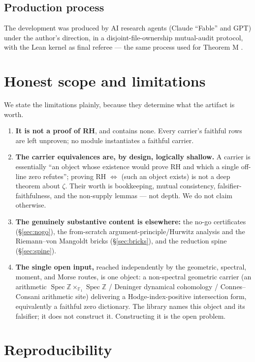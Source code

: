 \documentclass[11pt]{amsart}
\theoremstyle{definition}
\theoremstyle{remark}
\newcommand{\Z}{\mathbb{Z}}
\DeclareMathOperator{\Spec}{Spec}
\begin{document}
\subsection*{Production process}
The development was produced by AI research agents (Claude ``Fable'' and GPT)
under the author's direction, in a disjoint-file-ownership mutual-audit
protocol, with the Lean kernel as final referee --- the same process used for
Theorem M \cite{theoremM}.

\section{Honest scope and limitations}\label{sec:honest}

We state the limitations plainly, because they determine what the artifact is
worth.
\begin{enumerate}
\item \textbf{It is not a proof of RH}, and contains none. Every carrier's
faithful rows are left unproven; no module instantiates a faithful carrier.
\item \textbf{The carrier equivalences are, by design, logically shallow.} A
carrier is essentially ``an object whose existence would prove RH and which a
single off-line zero refutes''; proving RH $\iff$ (such an object exists) is not
a deep theorem about $\zeta$. Their worth is bookkeeping, mutual consistency,
falsifier-faithfulness, and the non-supply lemmas --- not depth. We do not claim
otherwise.
\item \textbf{The genuinely substantive content is elsewhere:} the no-go
certificates (\S\ref{sec:nogo}), the from-scratch argument-principle/Hurwitz
analysis and the Riemann--von Mangoldt bricks (\S\ref{sec:bricks}), and the
reduction spine (\S\ref{sec:spine}).
\item \textbf{The single open input,} reached independently by the geometric,
spectral, moment, and Morse routes, is one object: a non-spectral geometric
carrier (an arithmetic $\Spec\Z\times_{\mathbb F_1}\Spec\Z$ / Deninger dynamical
cohomology / Connes--Consani arithmetic site) delivering a Hodge-index-positive
intersection form, equivalently a faithful zero dictionary. The library names
this object and its falsifier; it does not construct it. Constructing it is the
open problem.
\end{enumerate}

\section{Reproducibility}\label{sec:repro}
\end{document}
